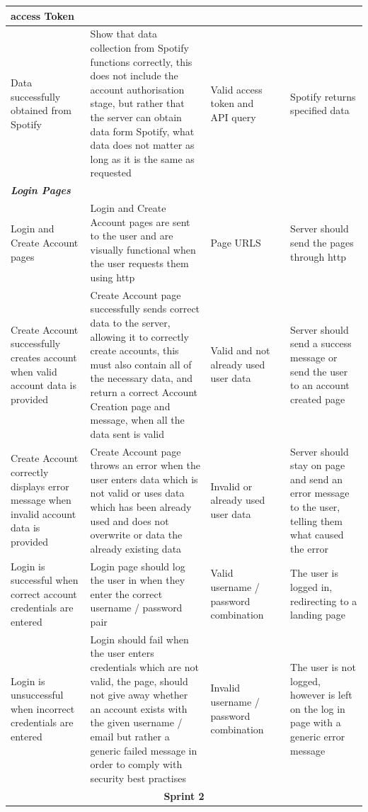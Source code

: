 \documentclass[11pt]{report}
\begin{document}
\begin{center}
\begin{longtable}{| p{2.5cm} | p{6cm} | p{2cm} | p{2cm} | p{2.5cm} | }
access Token\\
\hline
Data successfully obtained from Spotify&
Show that data collection from Spotify functions correctly, this does not include the account authorisation stage, but rather that the server can obtain data form Spotify, what data does not matter as long as it is the same as requested&
Valid access token and API query&&
Spotify returns specified data\\
\hline
\multicolumn{5}{|l|}{\textbf{\textit{Login Pages}}} \\
\hline
Login and Create Account pages&
Login and Create Account pages are sent to the user and are visually functional when the user requests them using http&
Page URLS&&
Server should send the pages through http\\
\hline
Create Account successfully creates account when valid account data is provided&
Create Account page successfully sends correct data to the server, allowing it to correctly create accounts, this must also contain all of the necessary data, and return a correct Account Creation page and message, when all the data sent is valid&
Valid and not already used user data&&
Server should send a success message or send the user to an account created page\\
\hline
Create Account correctly displays error message when invalid account data is provided&
Create Account page throws an error when the user enters data which is not valid or uses data which has been already used and does not overwrite or data the already existing data&Invalid or already used user data&&
Server should stay on page and send an error message to the user, telling them what caused the error\\
\hline
Login is successful when correct account credentials are entered&
Login page should log the user in when they enter the correct username / password pair&
Valid username / password combination&&
The user is logged in, redirecting to a landing page\\
\hline
Login is unsuccessful when incorrect credentials are entered&
Login should fail when the user enters credentials which are not valid, the page, should not give away whether an account exists with the given username / email but rather a generic failed message in order to comply with security best practises&
Invalid username / password combination&&
The user is not logged, however is left on the log in page with a generic error message\\
\hline
\multicolumn{5}{|c|}{\textbf{Sprint 2}} \\

\end{longtable}
\end{center}
\end{document}
